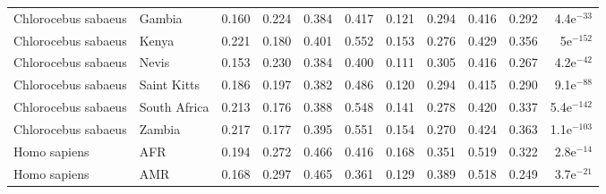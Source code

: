 \begin{center}
\begin{adjustbox}{width = 1\textwidth}
\begin{tabular}{llrrrrrrrrr}
 Chlorocebus sabaeus &                    Gambia &                              0.160 &                               0.224 &                 0.384 &                 0.417 &                              0.121 &                               0.294 &                 0.416 &                 0.292 &  4.4e$^{-33}$ \\
 Chlorocebus sabaeus &                     Kenya &                              0.221 &                               0.180 &                 0.401 &                 0.552 &                              0.153 &                               0.276 &                 0.429 &                 0.356 &   5e$^{-152}$ \\
 Chlorocebus sabaeus &                     Nevis &                              0.153 &                               0.230 &                 0.384 &                 0.400 &                              0.111 &                               0.305 &                 0.416 &                 0.267 &  4.2e$^{-42}$ \\
 Chlorocebus sabaeus &               Saint Kitts &                              0.186 &                               0.197 &                 0.382 &                 0.486 &                              0.120 &                               0.294 &                 0.415 &                 0.290 &  9.1e$^{-88}$ \\
 Chlorocebus sabaeus &              South Africa &                              0.213 &                               0.176 &                 0.388 &                 0.548 &                              0.141 &                               0.278 &                 0.420 &                 0.337 & 5.4e$^{-142}$ \\
 Chlorocebus sabaeus &                    Zambia &                              0.217 &                               0.177 &                 0.395 &                 0.551 &                              0.154 &                               0.270 &                 0.424 &                 0.363 & 1.1e$^{-103}$ \\
        Homo sapiens &                       AFR &                              0.194 &                               0.272 &                 0.466 &                 0.416 &                              0.168 &                               0.351 &                 0.519 &                 0.322 &  2.8e$^{-14}$ \\
        Homo sapiens &                       AMR &                              0.168 &                               0.297 &                 0.465 &                 0.361 &                              0.129 &                               0.389 &                 0.518 &                 0.249 &  3.7e$^{-21}$ \\

\end{tabular}
\end{adjustbox}
\end{center}
